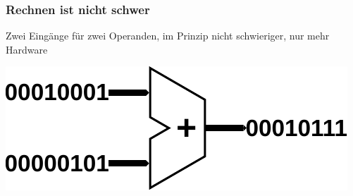 \documentclass[t,aspectratio=169,usenames,dvipsnames]{beamer}
\begin{document}



\begin{frame}[c]
  \frametitle{Rechnen ist nicht schwer}

  \strut{}Zwei Eingänge für zwei Operanden, im Prinzip nicht schwieriger, nur mehr Hardware

  \bigskip

  \centering\includegraphics[width=.9\textwidth]{adder.pdf}
\end{frame}
\end{document}
